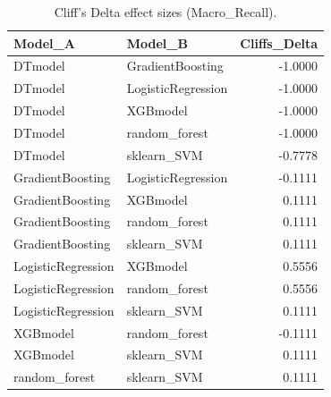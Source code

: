 \begin{table}[t]
\centering
\begin{tabular}{llr}
\toprule
Model_A & Model_B & Cliffs_Delta \\
\midrule
DTmodel & GradientBoosting & -1.0000 \\
DTmodel & LogisticRegression & -1.0000 \\
DTmodel & XGBmodel & -1.0000 \\
DTmodel & random_forest & -1.0000 \\
DTmodel & sklearn_SVM & -0.7778 \\
GradientBoosting & LogisticRegression & -0.1111 \\
GradientBoosting & XGBmodel & 0.1111 \\
GradientBoosting & random_forest & 0.1111 \\
GradientBoosting & sklearn_SVM & 0.1111 \\
LogisticRegression & XGBmodel & 0.5556 \\
LogisticRegression & random_forest & 0.5556 \\
LogisticRegression & sklearn_SVM & 0.1111 \\
XGBmodel & random_forest & -0.1111 \\
XGBmodel & sklearn_SVM & 0.1111 \\
random_forest & sklearn_SVM & 0.1111 \\
\bottomrule
\end{tabular}
\caption{Cliff's Delta effect sizes (Macro_Recall).}
\label{tab:cliffs_Macro_Recall}
\end{table}